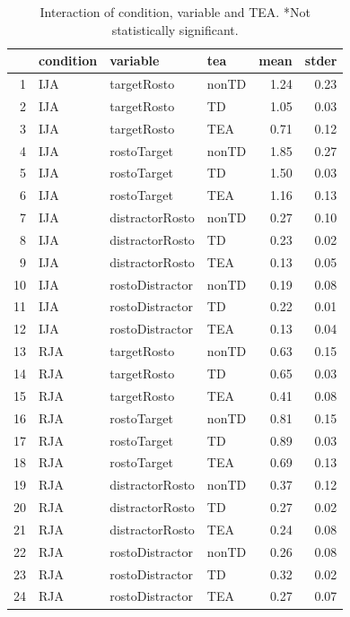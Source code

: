 \documentclass{article}
\begin{document}
\begin{table}[ht]
\centering
\caption{Interaction of condition, variable and TEA. *Not statistically significant.}
\begin{tabular}{rlllrr}
  \hline
 & condition & variable & tea & mean & stder \\ 
  \hline
1 & IJA & targetRosto & nonTD & 1.24 & 0.23 \\ 
  2 & IJA & targetRosto & TD & 1.05 & 0.03 \\ 
  3 & IJA & targetRosto & TEA & 0.71 & 0.12 \\ 
  4 & IJA & rostoTarget & nonTD & 1.85 & 0.27 \\ 
  5 & IJA & rostoTarget & TD & 1.50 & 0.03 \\ 
  6 & IJA & rostoTarget & TEA & 1.16 & 0.13 \\ 
  7 & IJA & distractorRosto & nonTD & 0.27 & 0.10 \\ 
  8 & IJA & distractorRosto & TD & 0.23 & 0.02 \\ 
  9 & IJA & distractorRosto & TEA & 0.13 & 0.05 \\ 
  10 & IJA & rostoDistractor & nonTD & 0.19 & 0.08 \\ 
  11 & IJA & rostoDistractor & TD & 0.22 & 0.01 \\ 
  12 & IJA & rostoDistractor & TEA & 0.13 & 0.04 \\ 
  13 & RJA & targetRosto & nonTD & 0.63 & 0.15 \\ 
  14 & RJA & targetRosto & TD & 0.65 & 0.03 \\ 
  15 & RJA & targetRosto & TEA & 0.41 & 0.08 \\ 
  16 & RJA & rostoTarget & nonTD & 0.81 & 0.15 \\ 
  17 & RJA & rostoTarget & TD & 0.89 & 0.03 \\ 
  18 & RJA & rostoTarget & TEA & 0.69 & 0.13 \\ 
  19 & RJA & distractorRosto & nonTD & 0.37 & 0.12 \\ 
  20 & RJA & distractorRosto & TD & 0.27 & 0.02 \\ 
  21 & RJA & distractorRosto & TEA & 0.24 & 0.08 \\ 
  22 & RJA & rostoDistractor & nonTD & 0.26 & 0.08 \\ 
  23 & RJA & rostoDistractor & TD & 0.32 & 0.02 \\ 
  24 & RJA & rostoDistractor & TEA & 0.27 & 0.07 \\ 
   \hline
\end{tabular}
\end{table}
\end{document}
